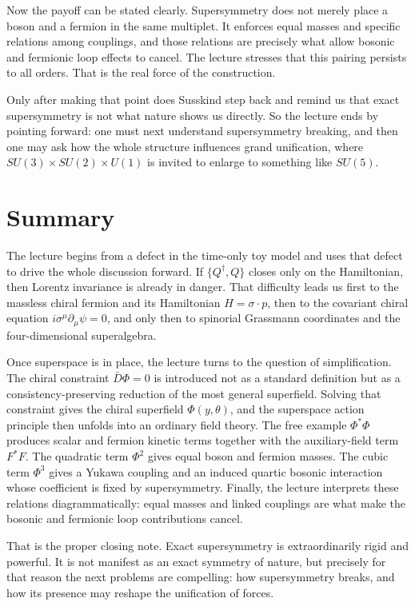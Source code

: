 Now the payoff can be stated clearly. Supersymmetry does not merely place a boson and a fermion in the same multiplet. It enforces equal masses and specific relations among couplings, and those relations are precisely what allow bosonic and fermionic loop effects to cancel. The lecture stresses that this pairing persists to all orders. That is the real force of the construction.

Only after making that point does Susskind step back and remind us that exact supersymmetry is not what nature shows us directly. So the lecture ends by pointing forward: one must next understand supersymmetry breaking, and then one may ask how the whole structure influences grand unification, where \(SU(3)\times SU(2)\times U(1)\) is invited to enlarge to something like \(SU(5)\).

\section{Summary}

The lecture begins from a defect in the time-only toy model and uses that defect to drive the whole discussion forward. If \(\{Q^\dagger,Q\}\) closes only on the Hamiltonian, then Lorentz invariance is already in danger. That difficulty leads us first to the massless chiral fermion and its Hamiltonian \(H=\sigma\cdot p\), then to the covariant chiral equation \(i\sigma^\mu\partial_\mu\psi=0\), and only then to spinorial Grassmann coordinates and the four-dimensional superalgebra.

Once superspace is in place, the lecture turns to the question of simplification. The chiral constraint \(\bar D\Phi=0\) is introduced not as a standard definition but as a consistency-preserving reduction of the most general superfield. Solving that constraint gives the chiral superfield \(\Phi(y,\theta)\), and the superspace action principle then unfolds into an ordinary field theory. The free example \(\Phi^\ast\Phi\) produces scalar and fermion kinetic terms together with the auxiliary-field term \(F^\ast F\). The quadratic term \(\Phi^2\) gives equal boson and fermion masses. The cubic term \(\Phi^3\) gives a Yukawa coupling and an induced quartic bosonic interaction whose coefficient is fixed by supersymmetry. Finally, the lecture interprets these relations diagrammatically: equal masses and linked couplings are what make the bosonic and fermionic loop contributions cancel.

That is the proper closing note. Exact supersymmetry is extraordinarily rigid and powerful. It is not manifest as an exact symmetry of nature, but precisely for that reason the next problems are compelling: how supersymmetry breaks, and how its presence may reshape the unification of forces.